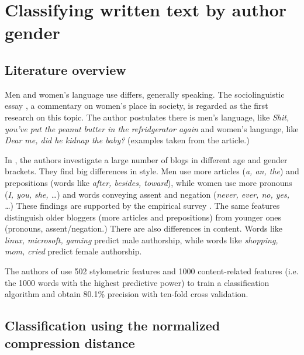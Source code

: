 \section{Classifying written text by author gender} 

\subsection{Literature overview}

Men and women's language use differs, generally speaking. The
sociolinguistic essay \cite{Lakoff1973}, a commentary on women's place in
society, is regarded as the first research on this topic. The author
postulates there is men's language, like \emph{Shit, you've put the peanut
butter in the refridgerator again} and women's language, like \emph{Dear
me, did he kidnap the baby?} (examples taken from the article.)

In \cite{Schler2005}, the authors investigate a large number of blogs in
different age and gender brackets. They find big differences in style. Men
use more articles (\emph{a, an, the}) and prepositions (words like
\emph{after, besides, toward}), while women use more pronouns (\emph{I,
you, she, \dots}) and words conveying assent and negation (\emph{never,
ever, no, yes, \dots}) These findings are supported by the empirical
survey \cite{Mulac2001}. The same features distinguish older bloggers
(more articles and prepositions) from younger ones (pronouns,
assent/negation.) There are also differences in content. Words like
\emph{linux, microsoft, gaming} predict male authorship, while words like
\emph{shopping, mom, cried} predict female authorship.

The authors of \cite{Schler2005} use 502 stylometric features and 1000
content-related features (i.e. the 1000 words with the highest predictive
power) to train a classification algorithm and obtain 80.1\% precision
with ten-fold cross validation.

\subsection{Classification using the normalized compression distance}



